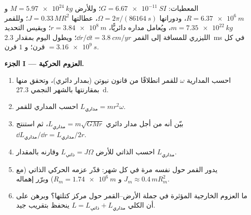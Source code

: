 \begin{problem}
\label{pb:b1:angular-momentum:1}
المعطيات: $G = \qty{6.67e-11}{SI}$؛ وللأرض $M = \qty{5.97e24}{kg}$ و $R =
\qty{6.37e6}{m}$، ودورانها $\Omega = 2\pi/(\qty{86164}{s})$،  عطالتها
$J = 0.33\,MR^2$؛ وللقمر $m = \qty{7.35e22}{kg}$، ويُعامل مداره
دائريًّا، $r = \qty{3.84e8}{m}$؛ ويقيس التحديد الليزري للمسافة إلى القمر
$\dd r/\dd t = \qty{3.8}{cm/yr}$؛ ويطول اليوم بمقدار \qty{2.3}{ms} في كل
قرن؛ و $1$ قرن $= \qty{3.16e9}{s}$.

\medskip
\noindent\textbf{الجزء I --- العزوم الحركية.}
\begin{enumerate}
  \item احسب  المدارية $\omega$ للقمر انطلاقًا من
        قانون نيوتن (بمدار دائري)، وتحقق منها بمقارنتها بالشهر
        النجمي \qty{27.3}{d}.
  \item احسب  المداري للقمر $L_{\text{مداري}} =
        mr^2\omega$.
  \item بيّن أنه من أجل مدار دائري $L_{\text{مداري}} = m\sqrt{GMr}$، ثم
        استنتج $\dd L_{\text{مداري}}/\dd r = L_{\text{مداري}}/2r$.
  \item احسب  الذاتي للأرض $L_{\text{ذاتي}} =
        J\Omega$ وقارنه بالمقدار $L_{\text{مداري}}$.
  \item يدور القمر حول نفسه مرة في كل شهر: قدّر عزمه الحركي
        الذاتي (مع $J_m \approx 0.4\,mR_m^2$ و $R_m = \qty{1.74e6}{m}$)
        وبرّر إهماله.
  \item ما العزوم الخارجية المؤثرة في جملة الأرض--القمر حول
        مركز كتلتها؟ وبرهن على أن  الكلي
        $L = L_{\text{ذاتي}} + L_{\text{مداري}}$ ينحفظ بتقريب جيد.
\end{enumerate}


\end{problem}
